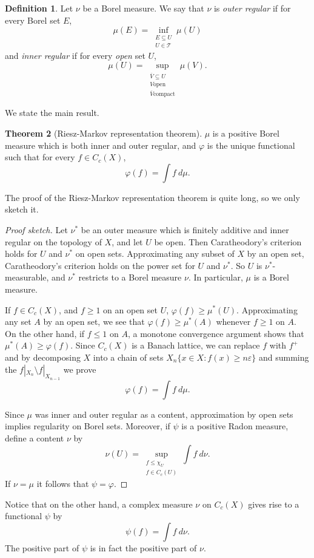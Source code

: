 \documentclass[12pt]{report}
\newcommand{\dfn}[1]{\emph{#1}\index{#1}}
\theoremstyle{definition}
\newtheorem{theorem}{Theorem}[chapter]
\newtheorem{definition}[theorem]{Definition}
\begin{document}
\begin{definition}
    Let $\nu$ be a Borel measure. We say that $\nu$ is \dfn{outer regular} if for every Borel set $E$,
    $$\mu(E) = \inf_{\substack{E \subseteq U\\U \in \mathcal T}} \mu(U)$$
    and \dfn{inner regular} if for every \emph{open} set $U$,
    $$\mu(U) = \sup_{\substack{\overline V \subseteq U\\V \text{open}\\\overline V \text{compact}}} \mu(V).$$
\end{definition}
    We state the main result.
\begin{theorem}[Riesz-Markov representation theorem]
    $\mu$ is a positive Borel measure which is both inner and outer regular, and $\varphi$ is the unique functional such that for every $f \in C_c(X)$,
    $$\varphi(f) = \int f~d\mu.$$
\end{theorem}
    The proof of the Riesz-Markov representation theorem is quite long, so we only sketch it.
\begin{proof}[Proof sketch]
    Let $\nu^*$ be an outer measure which is finitely additive and inner regular on the topology of $X$, and let $U$ be open. Then Caratheodory's criterion holds for $U$ and $\nu^*$ on open sets. Approximating any subset of $X$ by an open set, Caratheodory's criterion holds on the power set for $U$ and $\nu^*$. So $U$ is $\nu^*$-measurable, and $\nu^*$ restricts to a Borel measure $\nu$. In particular, $\mu$ is a Borel measure.

    If $f \in C_c(X)$, and $f \geq 1$ on an open set $U$, $\varphi(f) \geq \mu^*(U)$. Approximating any set $A$ by an open set, we see that $\varphi(f) \geq \mu^*(A)$ whenever $f \geq 1$ on $A$. On the other hand, if $f \leq 1$ on $A$, a monotone convergence argument shows that $\mu^*(A) \geq \varphi(f)$. Since $C_c(X)$ is a Banach lattice, we can replace $f$ with $f^+$ and by decomposing $X$ into a chain of sets $X_n \{x \in X: f(x) \geq n\varepsilon\}$ and summing the $f|_{X_n} \setminus f|_{X_{n-1}}$ we prove
    $$\varphi(f) = \int f~d\mu.$$

    Since $\mu$ was inner and outer regular as a content, approximation by open sets implies regularity on Borel sets. Moreover, if $\psi$ is a positive Radon measure, define a content $\nu$ by
    $$\nu(U) = \sup_{\substack{f \leq \chi_U\\f \in C_c(U)}} \int f ~d\nu.$$
    If $\nu = \mu$ it follows that $\psi = \varphi$.
\end{proof}
    Notice that on the other hand, a complex measure $\nu$ on $C_c(X)$ gives rise to a functional $\psi$ by
    $$\psi(f) = \int f ~d\nu.$$
    The positive part of $\psi$ is in fact the positive part of $\nu$.
\end{document}
